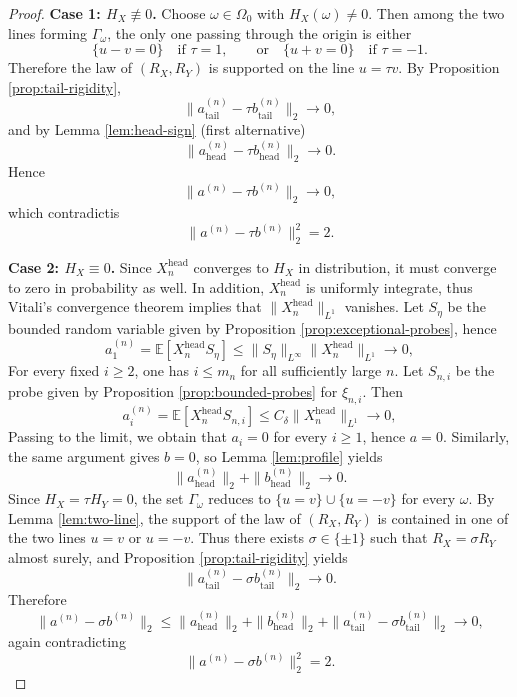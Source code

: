 \documentclass[11pt]{amsart}
\newcommand{\E}{\mathbb E}
\begin{document}
\begin{proof}
\medskip
\noindent
\textbf{Case 1: $H_X \not\equiv 0$.}
Choose $\omega \in \Omega_0$ with $H_X(\omega)\ne 0$. Then among the two lines
forming $\Gamma_\omega$, the only one passing through the origin is either
\[
\{u-v=0\} \quad \text{if } \tau=1,
\qquad \text{or} \quad
\{u+v=0\} \quad \text{if } \tau=-1.
\]
Therefore the law of $(R_X,R_Y)$ is supported on the line $u=\tau v$. By
Proposition \ref{prop:tail-rigidity},
\[
\|a^{(n)}_{\mathrm{tail}} - \tau b^{(n)}_{\mathrm{tail}}\|_2 \longrightarrow 0,
\]
and by Lemma \ref{lem:head-sign} (first alternative)
\[
\|a^{(n)}_{\mathrm{head}} - \tau b^{(n)}_{\mathrm{head}}\|_2 \longrightarrow 0.
\]
Hence
\[
\|a^{(n)}-\tau b^{(n)}\|_2 \longrightarrow 0,
\]
which contradictis
\[
\|a^{(n)}-\tau b^{(n)}\|_2^2
= 2.
\]

\medskip
\noindent
\textbf{Case 2: $H_X \equiv 0$.}
Since $X_n^{\mathrm{head}}$ converges to $H_X$ in distribution, it must converge to zero in probability as well. In addition, $X_n^{\mathrm{head}}$ is uniformly integrate, thus Vitali's convergence theorem implies that
$\|X_n^{\mathrm{head}}\|_{L^1}$ vanishes. Let $S_\eta$ be the bounded random variable given by Proposition \ref{prop:exceptional-probes}, hence
\[
a_1^{(n)}
=
\E[X_n^{\mathrm{head}} S_\eta]\le \|S_\eta\|_{L^\infty}
\|X_n^{\mathrm{head}}\|_{L^1}
\longrightarrow 0,
\]
For every fixed $i \ge 2$, one has $i \le m_n$ for all sufficiently large $n$.
Let $S_{n,i}$ be the probe given by Proposition \ref{prop:bounded-probes} for
$\xi_{n,i}$. Then
\[
a_i^{(n)}
=
\E[X_n^{\mathrm{head}} S_{n,i}]
\le C_\delta
\|X_n^{\mathrm{head}}\|_{L^1} \longrightarrow 0,
\]
Passing to
the limit, we obtain that $a_i=0$ for every $i \ge 1$, hence $a=0$. Similarly, the same argument gives $b=0$, so Lemma \ref{lem:profile} yields
\[
\|a^{(n)}_{\mathrm{head}}\|_2 + \|b^{(n)}_{\mathrm{head}}\|_2 \longrightarrow 0.
\]
Since $H_X = \tau H_Y = 0$, the set $\Gamma_\omega$ reduces to
$\{u=v\} \cup \{u=-v\}$ for every $\omega$. By Lemma \ref{lem:two-line}, the
support of the law of $(R_X,R_Y)$ is contained in one of the two lines $u=v$
or $u=-v$. Thus there exists $\sigma \in \{\pm 1\}$ such that
$R_X=\sigma R_Y$ almost surely, and Proposition
\ref{prop:tail-rigidity} yields
\[
\|a^{(n)}_{\mathrm{tail}} - \sigma b^{(n)}_{\mathrm{tail}}\|_2 \longrightarrow 0.
\]
Therefore
\[
\|a^{(n)}-\sigma b^{(n)}\|_2
\le
\|a^{(n)}_{\mathrm{head}}\|_2
+
\|b^{(n)}_{\mathrm{head}}\|_2
+
\|a^{(n)}_{\mathrm{tail}}-\sigma b^{(n)}_{\mathrm{tail}}\|_2
\longrightarrow 0,
\]
again contradicting
\[
\|a^{(n)}-\sigma b^{(n)}\|_2^2 = 2.
\]
\end{proof}



\end{document}
